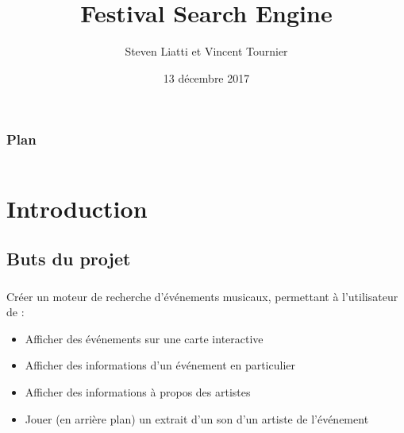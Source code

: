 \documentclass[10pt]{beamer}
\begin{document}

\title{Festival Search Engine}
\author{Steven Liatti et Vincent Tournier}
\date{13 décembre 2017}

\begin{frame}
\titlepage
\end{frame}

\begin{frame}
	\setcounter{tocdepth}{2}
    \frametitle{Plan}
    \begin{columns}[t]
        \begin{column}{.5\textwidth}
            \tableofcontents[sections={1-2}]
        \end{column}
        \begin{column}{.5\textwidth}
            \tableofcontents[sections={3-4}]
        \end{column}
    \end{columns}
\end{frame}



\section{Introduction}
\subsection{Buts du projet}
\begin{frame}
	\frametitle{\secname}
	\framesubtitle{\subsecname}
	Créer un moteur de recherche d'événements musicaux, permettant à l'utilisateur de :
	\begin{itemize}
		\item Afficher des événements sur une carte interactive
		\item Afficher des informations d'un événement en particulier
		\item Afficher des informations à propos des artistes
		\item Jouer (en arrière plan) un extrait d'un son d'un artiste de l'événement
	\end{itemize}
\end{frame}
\end{document}
